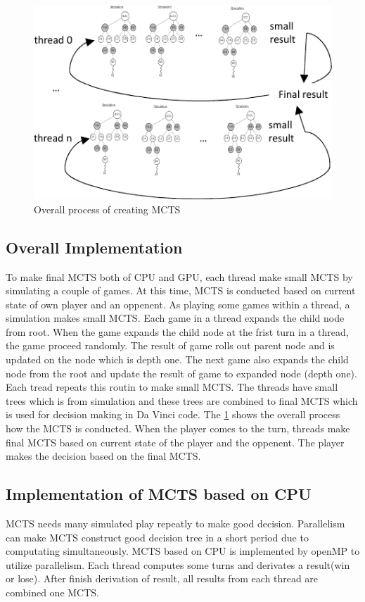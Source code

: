 \documentclass[conference]{IEEEtran}
\begin{document}
\begin{figure}
\includegraphics[width=0.95\columnwidth]{figures/implementation.pdf}
\caption{Overall process of creating MCTS}
\label{fig:implementation}
\end{figure}

\subsection{Overall Implementation}
To make final MCTS both of CPU and GPU, each thread make small MCTS by simulating a couple of games.
At this time, MCTS is conducted based on current state of own player and an oppenent.
As playing some games within a thread, a simulation makes small MCTS.
Each game in a thread expands the child node from root. 
When the game expands the child node at the frist turn in a thread, the game proceed randomly. 
The result of game rolls out parent node and is updated on the node which is depth one. 
The next game also expands the child node from the root and update the result of game to expanded node (depth one).
Each tread repeats this routin to make small MCTS. 
The threads have small trees which is from simulation and these trees are combined to final MCTS which is used for decision making in Da Vinci code. 
The \cref{fig:implementation} shows the overall process how the MCTS is conducted.
When the player comes to the turn, threads make final MCTS based on current state of the player and the oppenent. 
The player makes the decision based on the final MCTS. 

\subsection{Implementation of MCTS based on CPU}
MCTS needs many simulated play repeatly to make good decision. 
Parallelism can make MCTS construct good decision tree in a short period due to computating simultaneously. 
MCTS based on CPU is implemented by openMP to utilize parallelism. Each thread computes some turns and derivates a result(win or lose). 
After finish derivation of result, all results from each thread are combined one MCTS.
\end{document}
